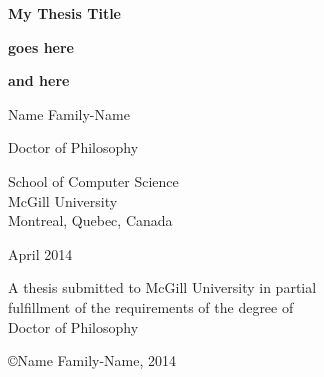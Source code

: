 \begin{titlepage}
\begin{center}

\vspace*{0.5cm}









{\sf\bfseries\LARGE  My Thesis Title }

\vspace{0.15cm}

{\sf\bfseries\LARGE  goes here}

\vspace{0.15cm}

{\sf\bfseries\LARGE  and here}



\vspace{1.8cm}

{\large Name Family-Name}

\vspace{1cm}

Doctor of Philosophy


\vspace{1.4cm}

School of Computer Science\\
McGill University\\
Montreal, Quebec, Canada\\

\vspace{1.5cm}


April 2014


\vspace{1.4cm}


\noindent
A thesis submitted to McGill University in partial\\
fulfillment of the requirements of the degree of\\
Doctor of Philosophy


\vspace{1.4cm}

{\small \copyright Name Family-Name, 2014}


\end{center}
\end{titlepage}






